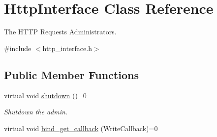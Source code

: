 \hypertarget{classHttpInterface}{\section{Http\-Interface Class Reference}
\label{classHttpInterface}
}


The H\-T\-T\-P Requests Administrators.  




{\ttfamily \#include $<$http\-\_\-interface.\-h$>$}

\subsection*{Public Member Functions}
\begin{DoxyCompactItemize}
\item 
\hypertarget{classHttpInterface_a3ac819dcec45535bf3c0fa614c5bdfce}{virtual void \hyperlink{classHttpInterface_a3ac819dcec45535bf3c0fa614c5bdfce}{shutdown} ()=0}\label{classHttpInterface_a3ac819dcec45535bf3c0fa614c5bdfce}

\begin{DoxyCompactList}\small\item\em Shutdown the admin. \end{DoxyCompactList}\item 
\hypertarget{classHttpInterface_ac5a64589f4c4b68c4feedc58497b7c06}{virtual void \hyperlink{classHttpInterface_ac5a64589f4c4b68c4feedc58497b7c06}{bind\-\_\-get\-\_\-callback} (Write\-Callback)=0}\label{classHttpInterface_ac5a64589f4c4b68c4feedc58497b7c06}


\end{DoxyCompactItemize}
